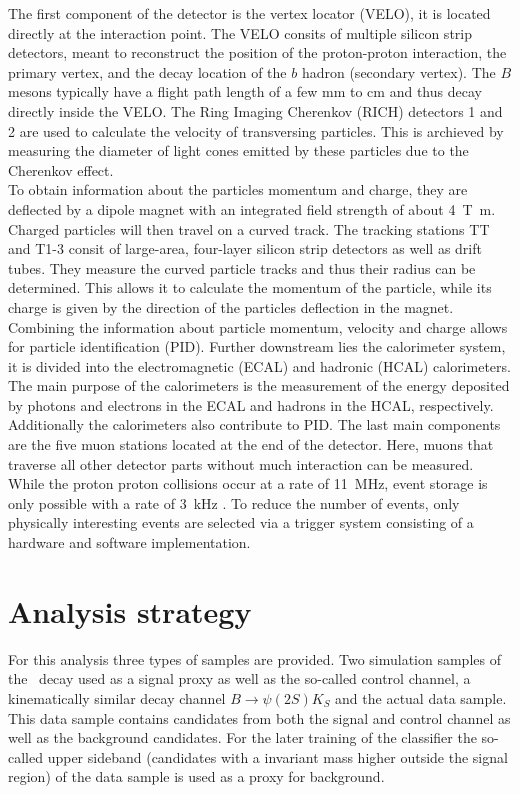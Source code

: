 The first component of the detector is the vertex locator (VELO), it is located directly at the interaction point. The VELO consits of multiple
silicon strip detectors, meant to reconstruct the position of the proton-proton interaction, the primary vertex, and the decay location of the $b$ hadron (secondary vertex).
The $B$ mesons typically have a flight path length of a few $\si{\milli\meter}$ to $\si{\centi\meter}$ and thus decay directly inside the VELO.
The Ring Imaging Cherenkov (RICH) detectors 1 and 2 are used to calculate the velocity of transversing particles. This is archieved by measuring the diameter of light cones emitted by these 
particles due to the Cherenkov effect. \\
To obtain information about the particles momentum and charge, they are deflected by a dipole magnet with an integrated field strength of about \qty{4}{\tesla\meter}. Charged particles
will then travel on a curved track. The tracking stations TT and T1-3 consit of large-area, four-layer silicon strip detectors as well as drift tubes. They measure the
curved particle tracks and thus their radius can be determined. This allows it to calculate the momentum of the particle, while its charge is given by the direction of the particles deflection
in the magnet. Combining the information about particle momentum, velocity and charge allows for particle identification (PID).
Further downstream lies the calorimeter system, it is divided into the electromagnetic (ECAL) and hadronic (HCAL) calorimeters.
The main purpose of the calorimeters is the measurement of the energy deposited by photons and electrons in the ECAL and hadrons in the HCAL, respectively.
Additionally the calorimeters also contribute to PID. The last main components are the five muon stations located at the end of the detector. Here, muons that traverse all other
detector parts without much interaction can be measured. \\
While the proton proton collisions occur at a rate of \qty{11}{\mega\hertz}, event storage is only possible with a rate of \qty{3}{\kilo\hertz} \cite{LHCbMVA}. To reduce the
number of events, only physically interesting events are selected via a trigger system consisting of a hardware and software implementation.

\section{Analysis strategy}
For this analysis three types of samples are provided. Two simulation samples of the \signal \ decay used as a signal proxy as well as the so-called control channel, a kinematically similar decay channel $B \to \psi(2S)K_S$ and the actual data sample. This data sample contains candidates from both the signal and control channel as well as the background candidates. For the later training of the classifier the so-called upper sideband (candidates with a invariant mass higher outside the signal region) of the data sample is used as a proxy for background.\\

